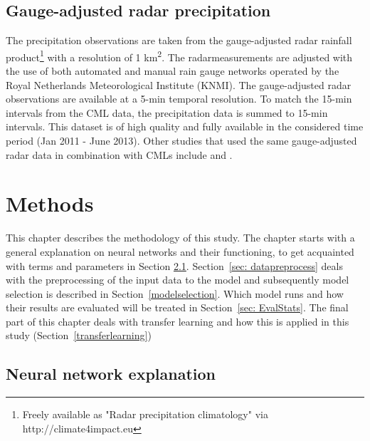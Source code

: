 \documentclass[twocolumn, 10pt, a4paper]{memoir}
\begin{document}
	
	

	
	\section{Gauge-adjusted radar precipitation} \label{sec: Ref prec data}
	The precipitation observations are taken from the gauge-adjusted radar rainfall product\footnote{Freely available as "Radar precipitation climatology" via http://climate4impact.eu} with a resolution of 1 km\textsuperscript{2}. The radarmeasurements are adjusted with the use of both automated and manual rain gauge networks operated by the Royal Netherlands Meteorological Institute (KNMI). The gauge-adjusted radar observations are available at a 5-min temporal resolution. To match the 15-min intervals from the CML data, the precipitation data is summed to 15-min intervals. This dataset is of high quality and fully available in the considered time period (Jan 2011 - June 2013). Other studies that used the same gauge-adjusted radar data in combination with CMLs include  and .

	
	
	\chapter{Methods} \label{ch: methods}
	This chapter describes the methodology of this study. The chapter starts with a general explanation on neural networks and their functioning, to get acquainted with terms and parameters in Section \ref{sec: NN explain}. Section~\ref{sec: datapreprocess} deals with the preprocessing of the input data to the model and subsequently model selection is described in Section~\ref{modelselection}. Which model runs and how their results are evaluated will be treated in Section~\ref{sec: EvalStats}. The final part of this chapter deals with transfer learning and how this is applied in this study (Section~\ref{transferlearning})
	\section{Neural network explanation} \label{sec: NN explain}
\end{document}
